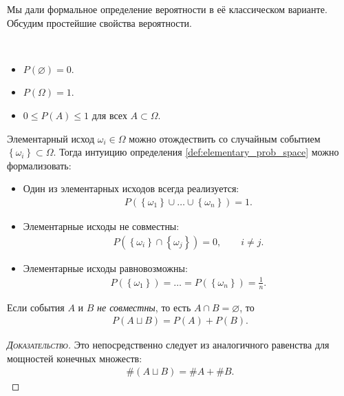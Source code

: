 \documentclass[../main.tex]{subfiles}
\begin{document}
Мы дали формальное определение вероятности в её классическом варианте. Обсудим простейшие свойства вероятности.

\begin{prop}\
 \begin{itemize}
  \item $ P(\varnothing)=0 $.
  \item $ P(\Omega) = 1 $.
  \item $ 0 \leqslant P(A) \leqslant 1 $ для всех $ A \subset \Omega $.
 \end{itemize}
\end{prop}

\begin{remrk}
 Элементарный исход $ \omega_i \in \Omega $ можно отождествить со случайным событием $ \left\{ \omega_i \right\} \subset \Omega $. Тогда интуицию определения \ref{def:elementary_prob_space} можно формализовать:
 \begin{itemize}
  \item Один из элементарных исходов всегда реализуется:
   \begin{align*}
    P(\left\{ \omega_1 \right\} \cup \ldots \cup \left\{ \omega_n \right\}) = 1.
   \end{align*}
  \item Элементарные исходы не совместны:
   \begin{align*}
    P(\left\{ \omega_i \right\} \cap \left\{ \omega_j \right\}) = 0, \qquad i \neq j.
   \end{align*}
  \item Элементарные исходы равновозможны:
   \begin{align*}
    P(\left\{ \omega_1 \right\}) = \ldots = P(\left\{ \omega_n \right\}) = \frac{1}{n}.
   \end{align*}
 \end{itemize}
\end{remrk}

\begin{prop}
 Если события $ A $ и $ B $ \textit{не совместны}, то есть $ A \cap B = \varnothing $, то
 \begin{align}
  \label{eq:elem_prob_additivity}
  P(A \sqcup B) = P(A) + P(B).
 \end{align}
\end{prop}
\begin{proof}[\normalfont\textsc{Доказательство}]
 Это непосредственно следует из аналогичного равенства для мощностей конечных множеств:
 \begin{align*}
  \#(A\sqcup B) = \#A+\# B.
 \end{align*}
\end{proof}
\end{document}
